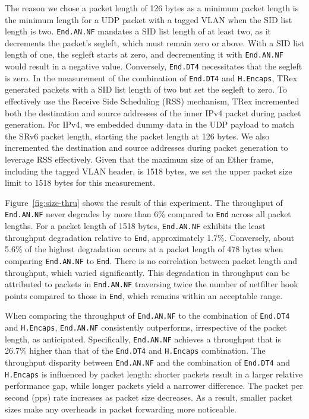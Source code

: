 The reason we chose a packet length of 126 bytes as a minimum packet length is the minimum length for a UDP packet with a tagged VLAN when the SID list length is two.
\texttt{End.AN.NF} mandates a SID list length of at least two, as it decrements the packet's segleft, which must remain zero or above.
With a SID list length of one, the segleft starts at zero, and decrementing it with \texttt{End.AN.NF} would result in a negative value.
Conversely, \texttt{End.DT4} necessitates that the segleft is zero.
In the measurement of the combination of \texttt{End.DT4} and \texttt{H.Encaps}, TRex generated packets with a SID list length of two but set the segleft to zero.
To effectively use the Receive Side Scheduling (RSS) mechanism, TRex incremented both the destination and source addresses of the inner IPv4 packet during packet generation.
For IPv4, we embedded dummy data in the UDP payload to match the SRv6 packet length, starting the packet length at 126 bytes.
We also incremented the destination and source addresses during packet generation to leverage RSS effectively.
Given that the maximum size of an Ether frame, including the tagged VLAN header, is 1518 bytes, we set the upper packet size limit to 1518 bytes for this measurement.


Figure~\ref{fig:size-thru} shows the result of this experiment.
The throughput of \texttt{End.AN.NF} never degrades by more than 6\% compared to \texttt{End} across all packet lengths.
For a packet length of 1518 bytes, \texttt{End.AN.NF} exhibits the least throughput degradation relative to \texttt{End}, approximately 1.7\%.
Conversely, about 5.6\% of the highest degradation occurs at a packet length of 478 bytes when comparing \texttt{End.AN.NF} to \texttt{End}.
There is no correlation between packet length and throughput, which varied significantly.
This degradation in throughput can be attributed to packets in \texttt{End.AN.NF} traversing twice the number of netfilter hook points compared to those in \texttt{End}, which remains within an acceptable range.


When comparing the throughput of \texttt{End.AN.NF} to the combination of \texttt{End.DT4} and \texttt{H.Encaps}, \texttt{End.AN.NF} consistently outperforms, irrespective of the packet length, as anticipated.
Specifically, \texttt{End.AN.NF} achieves a throughput that is 26.7\% higher than that of the \texttt{End.DT4} and \texttt{H.Encaps} combination.
The throughput disparity between \texttt{End.AN.NF} and the combination of \texttt{End.DT4} and \texttt{H.Encaps} is influenced by packet length: shorter packets result in a larger relative performance gap, while longer packets yield a narrower difference.
The packet per second (pps) rate increases as packet size decreases.
As a result, smaller packet sizes make any overheads in packet forwarding more noticeable.


